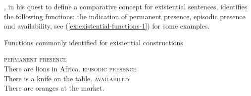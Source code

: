 \documentclass[output=paper,chinesefont,colorlinks,citecolor=brown]{langscibook}
\begin{document}
\citet{haspelmath2021}, in his quest to define a comparative concept for existential sentences, identifies the following functions: the indication of permanent presence, episodic presence and availability, see (\ref{ex:existential-functions-1}) for some examples.

\begin{exe}
\ex Functions commonly identified for existential constructions \citep{haspelmath2021}\label{ex:existential-functions-1}
\begin{xlist}
\ex \textsc{permanent presence} \label{ex:existential-functions-1a}\\
There are lions in Africa.
\ex \textsc{episodic presence} \label{ex:existential-functions-1b}\\
There is a knife on the table.
\ex \textsc{availability} \label{ex:existential-functions-1c}\\
There are oranges at the market.
\end{xlist}
\end{exe}
\end{document}
